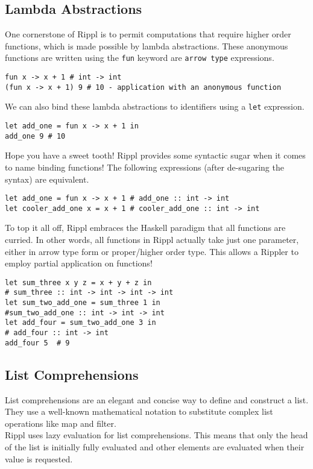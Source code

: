 \documentclass[5pt]{article}
\begin{document}
\subsection{Lambda Abstractions}
One cornerstone of Rippl is to permit computations that require higher order functions, which is made possible by lambda abstractions. These anonymous functions are written using the \texttt{fun} keyword are \texttt{arrow type} expressions.
\begin{lstlisting}[language=rippl]
fun x -> x + 1 # int -> int
(fun x -> x + 1) 9 # 10 - application with an anonymous function
\end{lstlisting}
We can also bind these lambda abstractions to identifiers using a \texttt{let} expression. 
\begin{lstlisting}[language=rippl]
let add_one = fun x -> x + 1 in
add_one 9 # 10
\end{lstlisting}
Hope you have a sweet tooth! Rippl provides some syntactic sugar when it comes to name binding functions! The following expressions (after de-sugaring the syntax) are equivalent.
\begin{lstlisting}[language=rippl]
let add_one = fun x -> x + 1 # add_one :: int -> int
let cooler_add_one x = x + 1 # cooler_add_one :: int -> int
\end{lstlisting}
To top it all off, Rippl embraces the Haskell paradigm that all functions are curried. In other words, all functions in Rippl actually take just one parameter, either in arrow type form or proper/higher order type. This allows a Rippler to employ partial application on functions!
\begin{lstlisting}[language=rippl]
let sum_three x y z = x + y + z in
# sum_three :: int -> int -> int -> int
let sum_two_add_one = sum_three 1 in
#sum_two_add_one :: int -> int -> int
let add_four = sum_two_add_one 3 in 
# add_four :: int -> int
add_four 5  # 9
\end{lstlisting}
\pagebreak

\subsection{List Comprehensions}
List comprehensions are an elegant and concise way to define and construct a list. They use a well-known mathematical notation to substitute complex list operations like map and filter. \\

\noindent Rippl uses lazy evaluation for list comprehensions. This means that only the head of the list is initially fully evaluated and other elements are evaluated when their value is requested. \\
\end{document}
